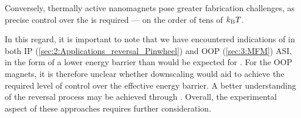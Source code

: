 Conversely, thermally active nanomagnets pose greater fabrication challenges, as precise control over the  is required --- on the order of tens of $\kBT$. \par
In this regard, it is important to note that we have encountered indications of  in both IP (\cref{sec:2:Applications_reversal_Pinwheel}) and OOP (\cref{sec:3:MFM}) ASI, in the form of a lower energy barrier than would be expected for .
For the OOP magnets, it is therefore unclear whether downscaling would aid to achieve the required level of control over the effective energy barrier.
A better understanding of the reversal process may be achieved through .
Overall, the experimental aspect of these approaches requires further consideration. \\\par

